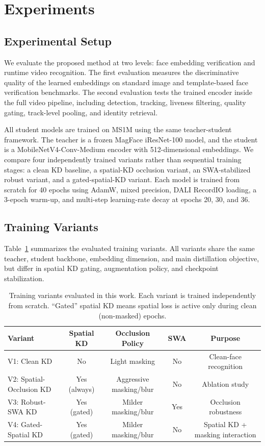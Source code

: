 \section{Experiments}

\subsection{Experimental Setup}

We evaluate the proposed method at two levels: face embedding verification and runtime video recognition. The first evaluation measures the discriminative quality of the learned embeddings on standard image and template-based face verification benchmarks. The second evaluation tests the trained encoder inside the full video pipeline, including detection, tracking, liveness filtering, quality gating, track-level pooling, and identity retrieval.

All student models are trained on MS1M using the same teacher-student framework\cite{MS1M}. The teacher is a frozen MagFace iResNet-100 model, and the student is a MobileNetV4-Conv-Medium encoder with 512-dimensional embeddings\cite{magface}\cite{mobilenetv4}. We compare four independently trained variants rather than sequential training stages: a clean KD baseline, a spatial-KD occlusion variant, an SWA-stabilized robust variant, and a gated-spatial-KD variant\cite{izmailov2019averagingweightsleadswider}. Each model is trained from scratch for 40 epochs using AdamW, mixed precision, DALI RecordIO loading, a 3-epoch warm-up, and multi-step learning-rate decay at epochs 20, 30, and 36.

\subsection{Training Variants}

Table~\ref{tab:training_variants} summarizes the evaluated training variants. All variants share the same teacher, student backbone, embedding dimension, and main distillation objective, but differ in spatial KD gating, augmentation policy, and checkpoint stabilization.

\begin{table}[h]
\centering
\caption{Training variants evaluated in this work. Each variant is trained independently from scratch. ``Gated'' spatial KD means spatial loss is active only during clean (non-masked) epochs.}
\label{tab:training_variants}
\begin{tabular}{lcccc}
\hline
\textbf{Variant} & \textbf{Spatial KD} & \textbf{Occlusion Policy} & \textbf{SWA} & \textbf{Purpose} \\
\hline
V1: Clean KD & No & Light masking & No & Clean-face recognition \\
V2: Spatial-Occlusion KD & Yes (always) & Aggressive masking/blur & No & Ablation study \\
V3: Robust-SWA KD & Yes (gated) & Milder masking/blur & Yes & Occlusion robustness \\
V4: Gated-Spatial KD & Yes (gated) & Milder masking/blur & No & Spatial KD + masking interaction \\
\hline
\end{tabular}
\end{table}

